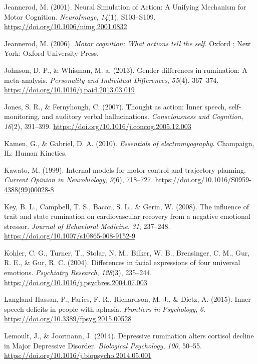 \documentclass[a4paper,12pt,twoside,openright,oldfontcommands]{memoir}
\begin{document}
\hypertarget{ref-jeannerod_neural_2001}{}
Jeannerod, M. (2001). Neural Simulation of Action: A Unifying Mechanism
for Motor Cognition. \emph{NeuroImage}, \emph{14}(1), S103--S109.
\url{https://doi.org/10.1006/nimg.2001.0832}

\hypertarget{ref-jeannerod_motor_2006}{}
Jeannerod, M. (2006). \emph{Motor cognition: What actions tell the
self}. Oxford ; New York: Oxford University Press.

\hypertarget{ref-Johnson2013}{}
Johnson, D. P., \& Whisman, M. a. (2013). Gender differences in
rumination: A meta-analysis. \emph{Personality and Individual
Differences}, \emph{55}(4), 367--374.
\url{https://doi.org/10.1016/j.paid.2013.03.019}

\hypertarget{ref-Jones2007}{}
Jones, S. R., \& Fernyhough, C. (2007). Thought as action: Inner speech,
self-monitoring, and auditory verbal hallucinations. \emph{Consciousness
and Cognition}, \emph{16}(2), 391--399.
\url{https://doi.org/10.1016/j.concog.2005.12.003}

\hypertarget{ref-kamen_essentials_2010}{}
Kamen, G., \& Gabriel, D. A. (2010). \emph{Essentials of
electromyography}. Champaign, IL: Human Kinetics.

\hypertarget{ref-kawato_internal_1999}{}
Kawato, M. (1999). Internal models for motor control and trajectory
planning. \emph{Current Opinion in Neurobiology}, \emph{9}(6), 718--727.
\url{https://doi.org/10.1016/S0959-4388(99)00028-8}

\hypertarget{ref-Key2008}{}
Key, B. L., Campbell, T. S., Bacon, S. L., \& Gerin, W. (2008). The
influence of trait and state rumination on cardiovascular recovery from
a negative emotional stressor. \emph{Journal of Behavioral Medicine},
\emph{31}, 237--248. \url{https://doi.org/10.1007/s10865-008-9152-9}

\hypertarget{ref-kohler_differences_2004}{}
Kohler, C. G., Turner, T., Stolar, N. M., Bilker, W. B., Brensinger, C.
M., Gur, R. E., \& Gur, R. C. (2004). Differences in facial expressions
of four universal emotions. \emph{Psychiatry Research}, \emph{128}(3),
235--244. \url{https://doi.org/10.1016/j.psychres.2004.07.003}

\hypertarget{ref-langland-hassan_inner_2015}{}
Langland-Hassan, P., Faries, F. R., Richardson, M. J., \& Dietz, A.
(2015). Inner speech deficits in people with aphasia. \emph{Frontiers in
Psychology}, \emph{6}. \url{https://doi.org/10.3389/fpsyg.2015.00528}

\hypertarget{ref-Lemoult2014}{}
Lemoult, J., \& Joormann, J. (2014). Depressive rumination alters
cortisol decline in Major Depressive Disorder. \emph{Biological
Psychology}, \emph{100}, 50--55.
\url{https://doi.org/10.1016/j.biopsycho.2014.05.001}
\end{document}
